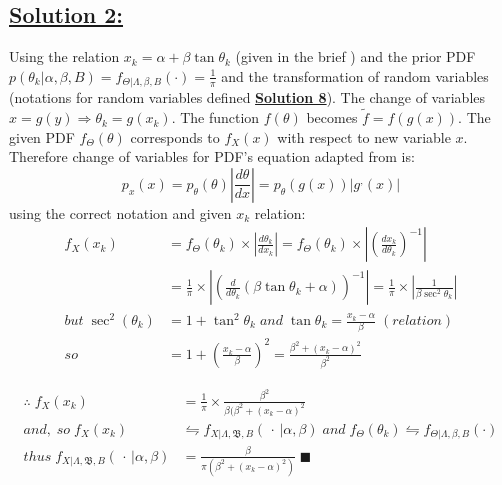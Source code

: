 \documentclass[a4paper,11pt]{article}
\begin{document}
\subsection*{\underline{Solution 2:}}
\label{sec:proof}
Using the relation $x_k = \alpha + \beta \tan \theta_k$ (given in the brief \cite{vanWyk2024}) and the prior PDF $p(\theta_k | \alpha, \beta, B) = f_{\Theta | \Lambda, \beta, B}(\cdot) = \frac{1}{\pi}$ and the transformation of random variables (notations for random variables defined \hyperref[sec:notation]{\textbf{Solution 8}}). The change of variables  $x = g(y) \Rightarrow \theta_k = g(x_k)$. The function $f(\theta)$ becomes $\tilde{f} = f(g(x))$. The given PDF $f_\Theta (\theta)$ corresponds to $f_X (x)$ with respect to new variable $x$. Therefore change of variables for PDF's equation adapted from \cite{bishop2006pattern} is:
\begin{equation}
	p_x(x) = p_\theta(\theta) \left| \frac{d\theta}{dx} \right| = p_\theta (g(x))|g^,(x)|
\end{equation}
using the correct notation and given $x_k$ relation:
\begin{align}
	f_X(x_k) &= f_\Theta (\theta_k) \times \left| \frac{d\theta_k}{dx_k} \right| = f_\Theta (\theta_k) \times \left| \left(\frac{dx_k}{d\theta_k} \right)^{-1} \right| \\
	&= \frac{1}{\pi} \times \left| \left( \frac{d}{d\theta_k}(\beta \tan \theta_k + \alpha) \right)^{-1}  \right| =\frac{1}{\pi} \times \left| \frac{1}{\beta \sec^2\theta_k} \right| \nonumber\\
	but \; \sec^2(\theta_k) &= 1 + \tan^2\theta_k \; and \; \tan\theta_k = \frac{x_k - \alpha}{\beta} \; (relation)\\
	so \; &= 1 + \left(\frac{x_k - \alpha}{\beta} \right)^2 = \frac{\beta^2 + (x_k - \alpha)^2}{\beta^2} \nonumber
\end{align}
	
\begin{align}
	\therefore \; f_X(x_k) &= \frac{1}{\pi} \times \frac{\beta^2}{\beta(\beta^2 + (x_k - \alpha)^2}\\
	and, \; so \; f_X(x_k) &\leftrightharpoons f_{X | \Lambda, \mathfrak{B}, B}(\, \cdot \, | \alpha, \beta) \; and \; f_\Theta (\theta_k) \leftrightharpoons f_{\Theta | \Lambda, \beta, B}(\cdot) \nonumber\\
	thus \; f_{X | \Lambda, \mathfrak{B}, B}(\, \cdot \, | \alpha, \beta) &= \frac{\beta}{\pi (\beta^2 + (x_k - \alpha)^2)} \; \blacksquare
\end{align}
\end{document}
